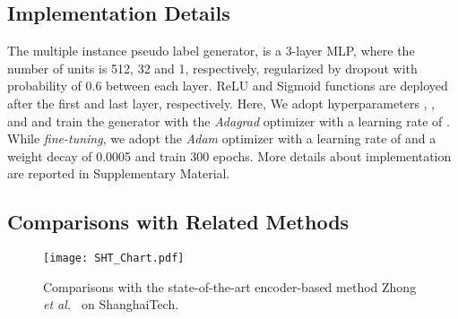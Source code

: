 \documentclass[final]{cvpr}
\newcommand{\ftnd}{\textcolor[rgb]{0.,0,0}}
\newcommand{\et}{\textit{et al.\ }}
\begin{document}
\subsection{Implementation Details}
\vspace{-0.1cm}






The multiple instance pseudo label generator, is a 3-layer MLP, where the number of units  is 512, 32 and 1, respectively, regularized by dropout with probability of 0.6 between each layer. ReLU and Sigmoid functions are deployed after the first and last layer, respectively. Here, We adopt hyperparameters , , and  and train the generator with the \textit{Adagrad} optimizer with a learning rate of . While \textit{fine-tuning}, we adopt the \textit{Adam} optimizer with a learning rate of  and a weight decay of 0.0005 and train 300 epochs. 
\ftnd{More details about implementation are reported in Supplementary Material.}
\subsection{Comparisons with Related Methods}
\vspace{-0.1cm}
\begin{figure}[t]
    \centering
    \texttt{[image: SHT\_Chart.pdf]}
    \vspace{-0.2cm}
    \caption{Comparisons with the state-of-the-art encoder-based method Zhong \et  \cite{zhong2019graph} on ShanghaiTech.}
    \vspace{-0.3cm}
    \label{fig:SHT_Chart}
\end{figure}
\end{document}
